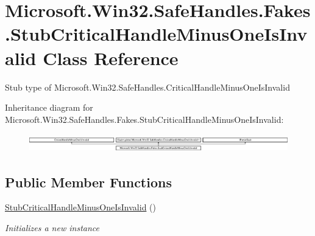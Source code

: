 \hypertarget{class_microsoft_1_1_win32_1_1_safe_handles_1_1_fakes_1_1_stub_critical_handle_minus_one_is_invalid}{\section{Microsoft.\-Win32.\-Safe\-Handles.\-Fakes.\-Stub\-Critical\-Handle\-Minus\-One\-Is\-Invalid Class Reference}
\label{class_microsoft_1_1_win32_1_1_safe_handles_1_1_fakes_1_1_stub_critical_handle_minus_one_is_invalid}
}


Stub type of Microsoft.\-Win32.\-Safe\-Handles.\-Critical\-Handle\-Minus\-One\-Is\-Invalid 


Inheritance diagram for Microsoft.\-Win32.\-Safe\-Handles.\-Fakes.\-Stub\-Critical\-Handle\-Minus\-One\-Is\-Invalid\-:\begin{figure}[H]
\begin{center}
\leavevmode
\includegraphics[height=0.801144cm]{class_microsoft_1_1_win32_1_1_safe_handles_1_1_fakes_1_1_stub_critical_handle_minus_one_is_invalid}
\end{center}
\end{figure}
\subsection*{Public Member Functions}
\begin{DoxyCompactItemize}
\item 
\hyperlink{class_microsoft_1_1_win32_1_1_safe_handles_1_1_fakes_1_1_stub_critical_handle_minus_one_is_invalid_af17bec3ce4dceed73ebc976631d00dee}{Stub\-Critical\-Handle\-Minus\-One\-Is\-Invalid} ()
\begin{DoxyCompactList}\small\item\em Initializes a new instance\end{DoxyCompactList}\end{DoxyCompactItemize}
